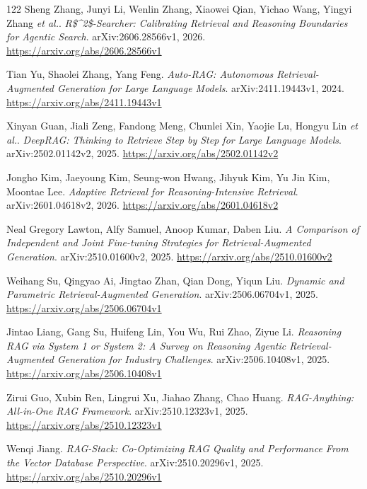 \documentclass[11pt,a4paper]{article}
\begin{document}
\begin{thebibliography}{122}
Sheng Zhang, Junyi Li, Wenlin Zhang, Xiaowei Qian, Yichao Wang, Yingyi Zhang \emph{et al.}.
\newblock \emph{R\$\textasciicircum{}2\$-Searcher: Calibrating Retrieval and Reasoning Boundaries for Agentic Search}.
\newblock arXiv:2606.28566v1, 2026.
\newblock \url{https://arxiv.org/abs/2606.28566v1}

Tian Yu, Shaolei Zhang, Yang Feng.
\newblock \emph{Auto-RAG: Autonomous Retrieval-Augmented Generation for Large Language Models}.
\newblock arXiv:2411.19443v1, 2024.
\newblock \url{https://arxiv.org/abs/2411.19443v1}

Xinyan Guan, Jiali Zeng, Fandong Meng, Chunlei Xin, Yaojie Lu, Hongyu Lin \emph{et al.}.
\newblock \emph{DeepRAG: Thinking to Retrieve Step by Step for Large Language Models}.
\newblock arXiv:2502.01142v2, 2025.
\newblock \url{https://arxiv.org/abs/2502.01142v2}

Jongho Kim, Jaeyoung Kim, Seung-won Hwang, Jihyuk Kim, Yu Jin Kim, Moontae Lee.
\newblock \emph{Adaptive Retrieval for Reasoning-Intensive Retrieval}.
\newblock arXiv:2601.04618v2, 2026.
\newblock \url{https://arxiv.org/abs/2601.04618v2}

Neal Gregory Lawton, Alfy Samuel, Anoop Kumar, Daben Liu.
\newblock \emph{A Comparison of Independent and Joint Fine-tuning Strategies for Retrieval-Augmented Generation}.
\newblock arXiv:2510.01600v2, 2025.
\newblock \url{https://arxiv.org/abs/2510.01600v2}

Weihang Su, Qingyao Ai, Jingtao Zhan, Qian Dong, Yiqun Liu.
\newblock \emph{Dynamic and Parametric Retrieval-Augmented Generation}.
\newblock arXiv:2506.06704v1, 2025.
\newblock \url{https://arxiv.org/abs/2506.06704v1}

Jintao Liang, Gang Su, Huifeng Lin, You Wu, Rui Zhao, Ziyue Li.
\newblock \emph{Reasoning RAG via System 1 or System 2: A Survey on Reasoning Agentic Retrieval-Augmented Generation for Industry Challenges}.
\newblock arXiv:2506.10408v1, 2025.
\newblock \url{https://arxiv.org/abs/2506.10408v1}

Zirui Guo, Xubin Ren, Lingrui Xu, Jiahao Zhang, Chao Huang.
\newblock \emph{RAG-Anything: All-in-One RAG Framework}.
\newblock arXiv:2510.12323v1, 2025.
\newblock \url{https://arxiv.org/abs/2510.12323v1}

Wenqi Jiang.
\newblock \emph{RAG-Stack: Co-Optimizing RAG Quality and Performance From the Vector Database Perspective}.
\newblock arXiv:2510.20296v1, 2025.
\newblock \url{https://arxiv.org/abs/2510.20296v1}


\end{thebibliography}
\end{document}
